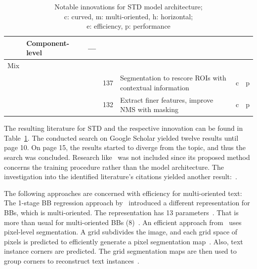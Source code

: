 \begin{table}[ht]
\begin{tabular}{p{}p{}p{}p{}
            p{}p{}p{}}
            & Component-level &~--- & & \\
        \midrule
        Mix & & \\
            & &~\cite{xie_scene_2018} & 137 & Segmentation to rescore \acp{ROI} with
                contextual information & c & p \\
            & &~\cite{dai_fused_2018} & 132 & Extract finer features, improve \ac{NMS} with masking
            & c & p \\
        \bottomrule
    \end{tabular}
    \captionsetup{justification=centering}
    \caption[Notable innovations for STD model architecture]{%
        Notable innovations for STD model architecture; \\
        c: curved, m: multi-oriented, h: horizontal; \\
        e: efficiency, p: performance\label{tb:STD-steps-properties}
    }
\end{table}
The resulting literature for \ac{STD} and the respective innovation can be found in
Table~\ref{tb:STD-steps-properties}.
The conducted search on Google Scholar yielded twelve results until page 10.
On page 15, the results started to diverge from the topic, and thus the search was concluded.
Research like~\cite{xue_accurate_2018} was not included since its proposed method concerns the
training procedure rather than the model architecture.
The investigation into the identified literature's citations yielded another
result:~\cite{ferrari_textsnake_2018}.

The following approaches are concerned with efficiency for multi-oriented text:
The 1-stage \ac{BB} regression approach by~\citep{liao_textboxes_2018} introduced a different
representation for \acp{BB}, which is multi-oriented.
The representation has 13 parameters~\citep{liao_textboxes_2018}.
That is more than usual for multi-oriented \acp{BB} (8)~\citep{ma_arbitrary-oriented_2018}.
An efficient approach from~\cite{lyu_multi-oriented_2018} uses pixel-level segmentation.
A grid subdivides the image, and each grid space of pixels is
predicted to efficiently generate a pixel segmentation map~\citep{lyu_multi-oriented_2018}.
Also, text instance corners are predicted.
The grid segmentation maps are then used to group corners to reconstruct text
instances~\citep{lyu_multi-oriented_2018}.

